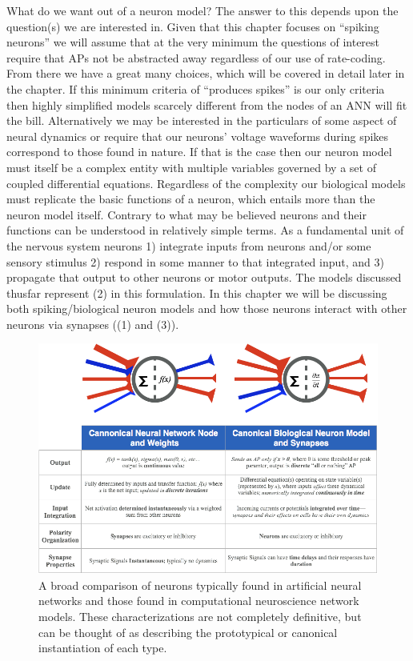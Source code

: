 What do we want out of a neuron model? The answer to this depends upon the question(s) we are interested in. Given that this chapter focuses on ``spiking neurons'' we will assume that at the very minimum the questions of interest require that APs not be abstracted away regardless of our use of rate-coding. From there we have a great many choices, which will be covered in detail later in the chapter. If this minimum criteria of ``produces spikes'' is our only criteria then highly simplified models scarcely different from the nodes of an ANN will fit the bill. Alternatively we may be interested in the particulars of some aspect of neural dynamics or require that our neurons' voltage waveforms during spikes correspond to those found in nature. If that is the case then our neuron model must itself be a complex entity with multiple variables governed by a set of coupled differential equations. Regardless of the complexity our biological models must replicate the basic functions of a neuron, which entails more than the neuron model itself. Contrary to what may be believed neurons and their functions can be understood in relatively simple terms. As a fundamental unit of the nervous system neurons 1) integrate inputs from neurons and/or some sensory stimulus 2) respond in some manner to that integrated input, and 3) propagate that output to other neurons or motor outputs. The models discussed thusfar represent (2) in this formulation. In this chapter we will be discussing both spiking/biological neuron models and how those neurons interact with other neurons via synapses ((1) and (3)).

\begin{figure}[h]
\centering
\includegraphics[width=\textwidth]{./images/NeuronComparison.png}
\caption[Simbrain Screenshot by Zo\"e Tosi ]{A broad comparison of neurons typically found in artificial neural networks and those found in computational neuroscience network models. These characterizations are not completely definitive, but can be thought of as describing the prototypical or canonical instantiation of each type.}
\label{NeuComp}
\end{figure}

